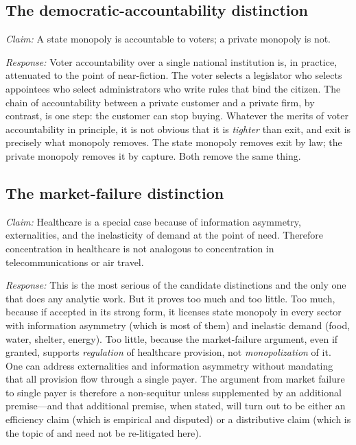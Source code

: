 \documentclass[11pt]{article}
\begin{document}
\subsection{The democratic-accountability distinction}\label{sec:democratic-accountability}

\emph{Claim:} A state monopoly is accountable to voters; a private monopoly is not.

\emph{Response:} Voter accountability over a single national institution is, in practice, attenuated to the point of near-fiction. The voter selects a legislator who selects appointees who select administrators who write rules that bind the citizen. The chain of accountability between a private customer and a private firm, by contrast, is one step: the customer can stop buying. Whatever the merits of voter accountability in principle, it is not obvious that it is \emph{tighter} than exit, and exit is precisely what monopoly removes. The state monopoly removes exit by law; the private monopoly removes it by capture. Both remove the same thing.

\subsection{The market-failure distinction}\label{sec:market-failure}

\emph{Claim:} Healthcare is a special case because of information asymmetry, externalities, and the inelasticity of demand at the point of need. Therefore concentration in healthcare is not analogous to concentration in telecommunications or air travel.

\emph{Response:} This is the most serious of the candidate distinctions and the only one that does any analytic work. But it proves too much and too little. Too much, because if accepted in its strong form, it licenses state monopoly in every sector with information asymmetry (which is most of them) and inelastic demand (food, water, shelter, energy). Too little, because the market-failure argument, even if granted, supports \emph{regulation} of healthcare provision, not \emph{monopolization} of it. One can address externalities and information asymmetry without mandating that all provision flow through a single payer. The argument from market failure to single payer is therefore a non-sequitur unless supplemented by an additional premise---and that additional premise, when stated, will turn out to be either an efficiency claim (which is empirical and disputed) or a distributive claim (which is the topic of \cite{mckinley0A,mckinley0B} and need not be re-litigated here).
\end{document}
